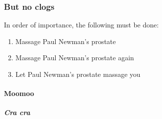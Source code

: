 \documentclass[]{article}
\begin{document}
\subsubsection{But no clogs}
In order of importance, the following must be done:
\begin{enumerate}
	\item Massage Paul Newman's prostate
	\item Massage Paul Newman's prostate again
	\item Let Paul Newman's prostate massage you
\end{enumerate}

\paragraph{Moomoo}
\subparagraph{Cra cra}
\end{document}
